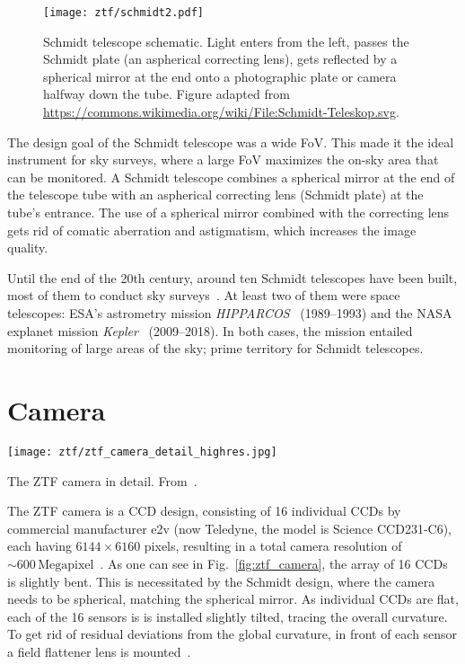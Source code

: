 \begin{figure}[htb]
    \texttt{[image: ztf/schmidt2.pdf]}
    \caption[Schmidt telescope schematic]{Schmidt telescope schematic. Light enters from the left, passes the Schmidt plate (an aspherical correcting lens), gets reflected by a spherical mirror at the end onto a photographic plate or camera halfway down the tube. Figure adapted from \url{https://commons.wikimedia.org/wiki/File:Schmidt-Teleskop.svg}.}
\end{figure}

The design goal of the Schmidt telescope was a wide FoV. This made it the ideal instrument for sky surveys, where a large FoV maximizes the on-sky area that can be monitored. A Schmidt telescope combines a spherical mirror at the end of the telescope tube with an aspherical correcting lens (Schmidt plate) at the tube's entrance. The use of a spherical mirror combined with the correcting lens gets rid of comatic aberration and astigmatism, which increases the image quality.

Until the end of the 20th century, around ten Schmidt telescopes have been built, most of them to conduct sky surveys~. At least two of them were space telescopes: ESA's astrometry mission \textit{HIPPARCOS}~ (1989--1993) and the NASA explanet mission \textit{Kepler}~ (2009--2018). In both cases, the mission entailed monitoring of large areas of the sky; prime territory for Schmidt telescopes.

\section{Camera}
\begin{marginfigure}
    \texttt{[image: ztf/ztf\_camera\_detail\_highres.jpg]}
    \caption[ZTF camera cutaway]{The ZTF camera in detail. From~\cite{Dekany2020}.}
\end{marginfigure}
The ZTF camera is a CCD design, consisting of 16 individual CCDs by commercial manufacturer e2v (now Teledyne, the model is Science CCD231-C6), each having $6144\times6160$ pixels, resulting in a total camera resolution of $\sim 600 \,\textrm{Megapixel}$~. As one can see in Fig.~\ref{fig:ztf_camera}, the array of 16 CCDs is slightly bent. This is necessitated by the Schmidt design, where the camera needs to be spherical, matching the spherical mirror. As individual CCDs are flat, each of the 16 sensors is is installed slightly tilted, tracing the overall curvature. To get rid of residual deviations from the global curvature, in front of each sensor a field flattener lens is mounted~.

